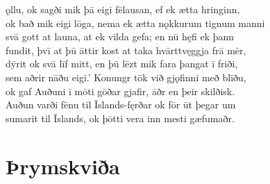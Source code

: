 \documentclass[12pt,letterpaper]{book}
\newcommand\emptypage{\clearpage{\pagestyle{empty}\cleardoublepage}}
\begin{document}
\begin{linenumbers}
ǫllu, ok sagði mik þā eigi fēlausan, ef ek ætta hringinn,\\
ok bað mik eigi lōga, nema ek ætta nǫkkurum tignum manni\\
svā gott at launa, at ek vilda gefa; en nū hęfi ek þann\\
fundit, þvī at þū āttir kost at taka hvārttvęggja frā mēr,\\
dȳrit ok svā līf mitt, en þū lēzt mik fara þangat ī friði,\\
sem aðrir nāðu eigi.'  Konungr tōk við gjǫfinni með blīðu,\\
ok gaf Auðuni ī mōti gōðar gjafir, āðr en þeir skilðisk.\\
Auðun varði fēnu til Īslands-fęrðar ok fōr ūt þegar um\\
sumarit til Īslands, ok þōtti vera inn mesti gæfumaðr.

\end{linenumbers}

\emptypage

\chapter{Þrymskviða}
\end{document}
